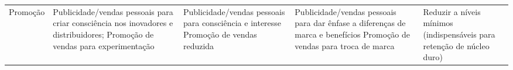 \documentclass[11pt]{article}
\begin{document}
\begin{tabular}{ C{2.1cm} | C{3.3cm} | C{3.3cm} | C{3.3cm} | C{3.3cm} }
    Promoção               & Publicidade/vendas pessoais para criar consciência nos inovadores e distribuidores; Promoção de vendas para experimentação & Publicidade/vendas pessoais para consciência e interesse Promoção de vendas reduzida & Publicidade/vendas pessoais para dar ênfase a diferenças de marca e benefícios Promoção de vendas para troca de marca & Reduzir a níveis mínimos (indispensáveis para retenção de núcleo  duro) \\
\end{tabular}
\end{document}
